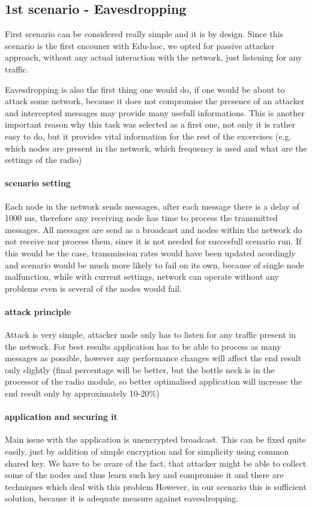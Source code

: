 \documentclass[
  digital, %
  table,   %
  nolof,     %
  nolot,     %
           oneside
]{fithesis3}
\begin{document}
    \subsection{1st scenario - Eavesdropping}\label{subsec:1st}
    First scenario can be considered really simple and it is by design. Since this scenario is the first encouner with Edu-hoc, we opted for passive attacker approach, without any actual interaction with the network, just listening for any traffic.

    Eavesdropping is also the first thing one would do, if one would be about to attack some network, because it does not compromise the presence of an attacker and intercepted messages may provide many usefull informations. This is another important reason why this task was selected as a first one, not only it is rather easy to do, but it provides vital information for the rest of the excercises (e.g. which nodes are present in the network, which frequency is used and what are the settings of the radio)

    \paragraph{scenario setting}
    Each node in the network sends messages, after each message there is a delay of 1000 ms, therefore any receiving node has time to process the transmitted messages. All messages are send as a broadcast and nodes within the network do not receive nor process them, since it is not needed for succesfull scenario run. If this would be the case, transmission rates would have been updated acordingly and scenario would be much more likely to fail on its own, because of single node malfunction, while with current settings, network can operate without any problems even is several of the nodes would fail.

    \paragraph{attack principle}
    Attack is very simple, attacker node only has to listen for any traffic present in the network. For best results application has to be able to process as many messages as possible, however any performance changes will affect the end result only slightly (final percentage will be better, but the bottle neck is in the processor of the radio module, so better optimalised application will increase the end result only by approximately 10-20\%)
    \paragraph{application and securing it}
    Main issue with the application is unencrypted broadcast. This can be fixed quite easily, just by addition of simple encryption and for simplicity using common shared key. We have to be avare of the fact, that attacker might be able to collect some of the nodes and thus learn such key and compromise it and there are techniques which deal with this problem %
    However, in our scenario this is sufficient solution, because it is adequate measure against eavesdropping.
\end{document}
